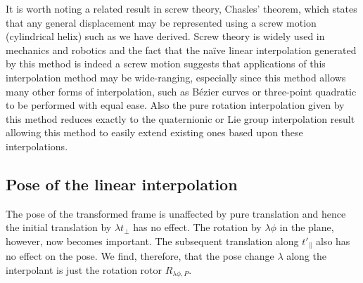 It is worth noting a related result in screw theory, Chasles' theorem, which
states that any general displacement may be represented using a screw motion
(cylindrical helix) such as we have derived. Screw theory is widely used in
mechanics and robotics and the fact that the na\"ive linear interpolation
generated by this method is indeed a screw motion suggests that
applications of this interpolation method may be wide-ranging, especially since
this method allows many other forms of interpolation, such as B\'ezier curves
or three-point quadratic to be performed with equal ease. Also the pure
rotation interpolation given by this method reduces exactly to the quaternionic
or Lie group interpolation result allowing this method to easily extend
existing ones based upon these interpolations.

\subsection{Pose of the linear interpolation}

The pose of the transformed frame is unaffected by pure translation and hence the initial
translation by $\lambda t_\perp$ has no effect. The rotation by $\lambda \phi$ in the plane,
however, now becomes important. The subsequent translation along $t'_\parallel$ also has
no effect on the pose. We find, therefore, that the pose change $\lambda$ along the 
interpolant is just the rotation rotor $R_{\lambda \phi, P}$.



